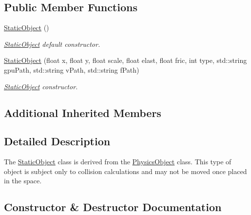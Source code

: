 \subsection*{Public Member Functions}
\begin{DoxyCompactItemize}
\item 
\hyperlink{class_static_object_a2a8e918ddfe5c6723b88b9f5c4156472}{Static\+Object} ()\hypertarget{class_static_object_a2a8e918ddfe5c6723b88b9f5c4156472}{}\label{class_static_object_a2a8e918ddfe5c6723b88b9f5c4156472}

\begin{DoxyCompactList}\small\item\em \hyperlink{class_static_object}{Static\+Object} default constructor. \end{DoxyCompactList}\item 
\hyperlink{class_static_object_ab949c8bad807f3da8813a0ccc33b1966}{Static\+Object} (float x, float y, float scale, float elast, float fric, int type, std\+::string gpu\+Path, std\+::string v\+Path, std\+::string f\+Path)
\begin{DoxyCompactList}\small\item\em \hyperlink{class_static_object}{Static\+Object} constructor. \end{DoxyCompactList}\end{DoxyCompactItemize}
\subsection*{Additional Inherited Members}


\subsection{Detailed Description}
The \hyperlink{class_static_object}{Static\+Object} class is derived from the \hyperlink{class_physics_object}{Physics\+Object} class. This type of object is subject only to collision calculations and may not be moved once placed in the space. 

\subsection{Constructor \& Destructor Documentation}
